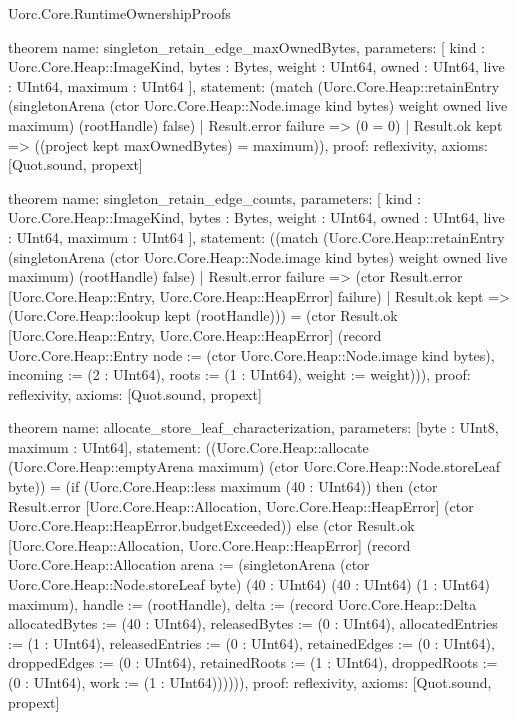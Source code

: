 \begin{lexlean}{Uorc.Core.RuntimeOwnershipProofs}
\begin{semanticmodule}
theorem{
  name: singleton_retain_edge_maxOwnedBytes,
  parameters: [
    kind : Uorc.Core.Heap::ImageKind,
    bytes : Bytes,
    weight : UInt64,
    owned : UInt64,
    live : UInt64,
    maximum : UInt64
  ],
  statement: (match (Uorc.Core.Heap::retainEntry (singletonArena (ctor Uorc.Core.Heap::Node.image kind bytes) weight owned live maximum) (rootHandle) false)
    | Result.error failure => (0 = 0)
    | Result.ok kept => ((project kept maxOwnedBytes) = maximum)),
  proof: reflexivity{},
  axioms: [Quot.sound, propext]
}

theorem{
  name: singleton_retain_edge_counts,
  parameters: [
    kind : Uorc.Core.Heap::ImageKind,
    bytes : Bytes,
    weight : UInt64,
    owned : UInt64,
    live : UInt64,
    maximum : UInt64
  ],
  statement: ((match (Uorc.Core.Heap::retainEntry (singletonArena (ctor Uorc.Core.Heap::Node.image kind bytes) weight owned live maximum) (rootHandle) false)
    | Result.error failure => (ctor Result.error [Uorc.Core.Heap::Entry, Uorc.Core.Heap::HeapError] failure)
    | Result.ok kept => (Uorc.Core.Heap::lookup kept (rootHandle))) = (ctor Result.ok [Uorc.Core.Heap::Entry, Uorc.Core.Heap::HeapError] (record Uorc.Core.Heap::Entry {node := (ctor Uorc.Core.Heap::Node.image kind bytes), incoming := (2 : UInt64), roots := (1 : UInt64), weight := weight}))),
  proof: reflexivity{},
  axioms: [Quot.sound, propext]
}

theorem{
  name: allocate_store_leaf_characterization,
  parameters: [byte : UInt8, maximum : UInt64],
  statement: ((Uorc.Core.Heap::allocate (Uorc.Core.Heap::emptyArena maximum) (ctor Uorc.Core.Heap::Node.storeLeaf byte)) = (if (Uorc.Core.Heap::less maximum (40 : UInt64)) then (ctor Result.error [Uorc.Core.Heap::Allocation, Uorc.Core.Heap::HeapError] (ctor Uorc.Core.Heap::HeapError.budgetExceeded)) else (ctor Result.ok [Uorc.Core.Heap::Allocation, Uorc.Core.Heap::HeapError] (record Uorc.Core.Heap::Allocation {arena := (singletonArena (ctor Uorc.Core.Heap::Node.storeLeaf byte) (40 : UInt64) (40 : UInt64) (1 : UInt64) maximum), handle := (rootHandle), delta := (record Uorc.Core.Heap::Delta {allocatedBytes := (40 : UInt64), releasedBytes := (0 : UInt64), allocatedEntries := (1 : UInt64), releasedEntries := (0 : UInt64), retainedEdges := (0 : UInt64), droppedEdges := (0 : UInt64), retainedRoots := (1 : UInt64), droppedRoots := (0 : UInt64), work := (1 : UInt64)})})))),
  proof: reflexivity{},
  axioms: [Quot.sound, propext]
}


\end{semanticmodule}
\end{lexlean}
